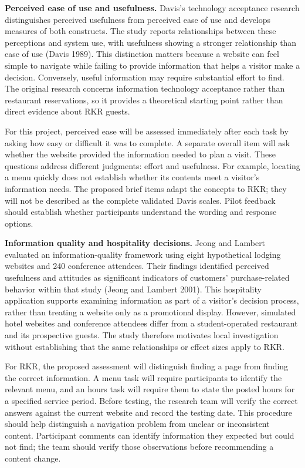 \documentclass[
  12pt,
  letterpaper,
  DIV=11,
  numbers=noendperiod]{scrartcl}
\begin{document}
\textbf{Perceived ease of use and usefulness.} Davis's technology
acceptance research distinguishes perceived usefulness from perceived
ease of use and develops measures of both constructs. The study reports
relationships between these perceptions and system use, with usefulness
showing a stronger relationship than ease of use (Davis 1989). This
distinction matters because a website can feel simple to navigate while
failing to provide information that helps a visitor make a decision.
Conversely, useful information may require substantial effort to find.
The original research concerns information technology acceptance rather
than restaurant reservations, so it provides a theoretical starting
point rather than direct evidence about RKR guests.

For this project, perceived ease will be assessed immediately after each
task by asking how easy or difficult it was to complete. A separate
overall item will ask whether the website provided the information
needed to plan a visit. These questions address different judgments:
effort and usefulness. For example, locating a menu quickly does not
establish whether its contents meet a visitor's information needs. The
proposed brief items adapt the concepts to RKR; they will not be
described as the complete validated Davis scales. Pilot feedback should
establish whether participants understand the wording and response
options.

\textbf{Information quality and hospitality decisions.} Jeong and
Lambert evaluated an information-quality framework using eight
hypothetical lodging websites and 240 conference attendees. Their
findings identified perceived usefulness and attitudes as significant
indicators of customers' purchase-related behavior within that study
(Jeong and Lambert 2001). This hospitality application supports
examining information as part of a visitor's decision process, rather
than treating a website only as a promotional display. However,
simulated hotel websites and conference attendees differ from a
student-operated restaurant and its prospective guests. The study
therefore motivates local investigation without establishing that the
same relationships or effect sizes apply to RKR.

For RKR, the proposed assessment will distinguish finding a page from
finding the correct information. A menu task will require participants
to identify the relevant menu, and an hours task will require them to
state the posted hours for a specified service period. Before testing,
the research team will verify the correct answers against the current
website and record the testing date. This procedure should help
distinguish a navigation problem from unclear or inconsistent content.
Participant comments can identify information they expected but could
not find; the team should verify those observations before recommending
a content change.
\end{document}
